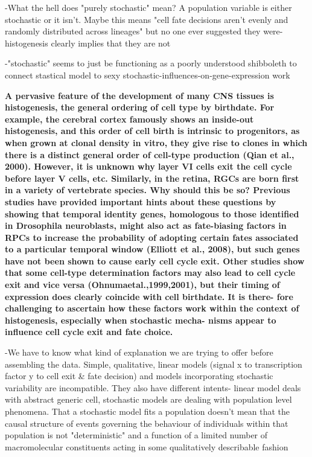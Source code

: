 \bigskip

-What the hell does "purely stochastic" mean? A population variable is either stochastic or it isn't. Maybe this means "cell fate decisions aren't evenly and randomly distributed across lineages" but no one ever suggested they were- histogenesis clearly implies that they are not

-"stochastic" seems to just be functioning as a poorly understood shibboleth to connect stastical model to sexy stochastic-influences-on-gene-expression work

\bigskip

\textbf{
A pervasive feature of the development of many CNS tissues
is histogenesis, the general ordering of cell type by birthdate.
For example, the cerebral cortex famously shows an inside-out
histogenesis, and this order of cell birth is intrinsic to progenitors,
as when grown at clonal density in vitro, they give rise to clones in
which there is a distinct general order of cell-type production
(Qian et al., 2000). However, it is unknown why layer VI cells
exit the cell cycle before layer V cells, etc. Similarly, in the retina,
RGCs are born first in a variety of vertebrate species. Why should
this be so? Previous studies have provided important hints
about these questions by showing that temporal identity genes,
homologous to those identified in Drosophila neuroblasts, might
also act as fate-biasing factors in RPCs to increase the probability
of adopting certain fates associated to a particular temporal
window (Elliott et al., 2008), but such genes have not been
shown to cause early cell cycle exit. Other studies show that
some cell-type determination factors may also lead to cell cycle
exit and vice versa (Ohnumaetal.,1999,2001), but their timing of
expression does clearly coincide with cell birthdate. It is there-
fore challenging to ascertain how these factors work within the
context of histogenesis, especially when stochastic mecha-
nisms appear to influence cell cycle exit and fate choice.}

\bigskip

-We have to know what kind of explanation we are trying to offer before assembling the data. Simple, qualitative, linear models (signal x to transcription factor y to cell exit \& fate decision) and models incorporating stochastic variability are incompatible. They also have different intents- linear model deals with abstract generic cell, stochastic models are dealing with population level phenomena. That a stochastic model fits a population doesn't mean that the causal structure of events governing the behaviour of individuals within that population is not "deterministic" and a function of a limited number of macromolecular constituents acting in some qualitatively describable fashion

